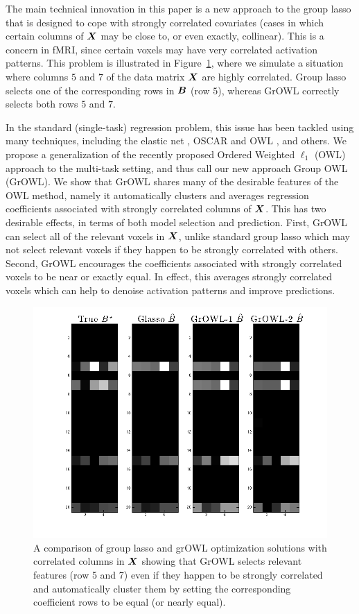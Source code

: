 The main technical innovation in this paper is a new approach to the group lasso that is
designed to cope with strongly correlated covariates (\ie cases in which certain columns
of $\boldsymbol{X}$ may be close to, or even exactly, collinear). This is a concern in fMRI, since
certain voxels may have very correlated activation patterns. This problem is illustrated
in Figure~\ref{Fig:sim}, where we simulate a situation where columns $5$ and $7$ of the
data matrix $\boldsymbol{X}$ are highly correlated. Group lasso selects one of the corresponding rows
in $\boldsymbol{B}$ (row $5$), whereas GrOWL correctly selects both rows $5$ and $7$.

In the standard (single-task) regression problem, this issue has been tackled using many
techniques, including the elastic net \citep{EN}, OSCAR \citep{oscar} and OWL \citep{owl},
and others. We propose a generalization of the recently proposed Ordered Weighted
$\ell_1$ (OWL) approach to the multi-task setting, and thus call our new approach Group
OWL (GrOWL). We show that GrOWL shares many of the desirable features of the OWL method,
namely it automatically clusters and averages regression coefficients associated with
strongly correlated columns of $\boldsymbol{X}$. This has two desirable effects, in terms of both
model selection and prediction. First, GrOWL can select all of the relevant voxels in
$\boldsymbol{X}$, unlike standard group lasso which may not select relevant voxels if they happen to
be strongly correlated with others. Second, GrOWL encourages the coefficients associated
with strongly correlated voxels to be near or exactly equal. In effect, this averages
strongly correlated voxels which can help to denoise activation patterns and improve
predictions.


\begin{figure}[!t]
    \centering
    \includegraphics[width=0.6\linewidth]{figures/sim3.png}
    \qquad
   \caption{A comparison of group lasso and grOWL optimization solutions with correlated columns in $\boldsymbol{X}$ showing that GrOWL selects relevant features (row 5 and 7) even if they happen to be strongly correlated and automatically cluster them by setting the corresponding coefficient rows to be equal (or nearly equal). \label{Fig:sim}}
  \end{figure}
